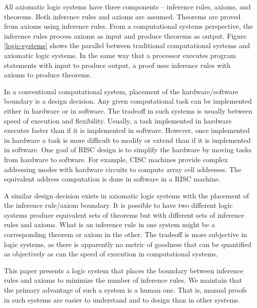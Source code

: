 \documentclass[12pt, fleqn, leqno]{article}
\begin{document}
All axiomatic logic systems have three components -- inference rules, axioms, and theorems.
Both inference rules and axioms are assumed.
Theorems are proved from axioms using inference rules.
From a computational systems perspective, the inference rules process axioms as input and produce theorems as output.
Figure \ref{logic-systems} shows the parallel between traditional computational systems and axiomatic logic systems.
In the same way that a processor executes program statements with input to produce output, a proof uses inference rules with axioms to produce theorems.

In a conventional computational system, placement of the hardware/software boundary is a design decision.
Any given computational task can be implemented either in hardware or in software.
The tradeoff in such systems is usually between speed of execution and flexibility.
Usually, a task implemented in hardware executes faster than if it is implemented in software.
However, once implemented in hardware a task is more difficult to modify or extend than if it is implemented in software.
One goal of RISC design is to simplify the hardware by moving tasks from hardware to software.
For example, CISC machines provide complex addressing modes with hardware circuits to compute array cell addresses.
The equivalent address computation is done in software in a RISC machine.

A similar design decision exists in axiomatic logic systems with the placement of the inference rule/axiom boundary.
It is possible to have two different logic systems produce equivalent sets of theorems but with different sets of inference rules and axioms.
What is an inference rule in one system might be a corresponding theorem or axiom in the other.
The tradeoff is more subjective in logic systems, as there is apparently no metric of goodness that can be quantified as objectively as can the speed of execution in computational systems.

This paper presents a logic system that places the boundary between inference rules and axioms to minimize the number of inference rules.
We maintain that the primary advantage of such a system is a human one.
That is, manual proofs in such systems are easier to understand and to design than in other systems.
\end{document}
